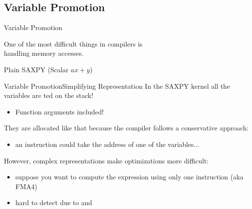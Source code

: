 \subsection{Variable Promotion}


\begin{frame}{Variable Promotion}
\begin{center}
One of the most difficult things in compilers is\\\alert{handling memory accesses}.
\end{center}
\vfill
\begin{block}{Plain SAXPY (Scalar $ax + y$)}
\centering
{}
\end{block}
\end{frame}


\begin{frame}{Variable Promotion}{Simplifying Representation}
In the SAXPY kernel all the variables are ted on the stack!
\begin{itemize}
\item Function arguments included!
\end{itemize}

\vfill
They are allocated like that because the compiler follows a \alert{conservative} approach:
\begin{itemize}
\item an instruction could take the address of one of the variables...
\end{itemize}

\vfill
However, complex representations make optimizations more difficult:
\begin{itemize}
\item suppose you want to compute the  expression using only \alert{one}
      instruction (aka FMA4)
\item hard to detect due to  and 
\end{itemize}
\end{frame}


